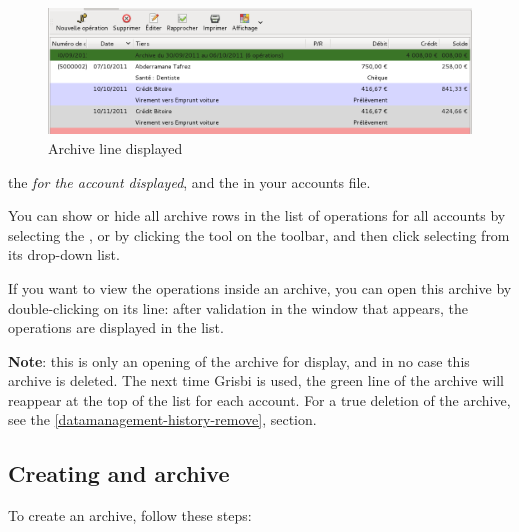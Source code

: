 \begin{figure}[htbp]
\begin{center}
\includegraphics[scale=0.5]{image/screenshot/datamanagement_history_line}
\end{center}
\caption{Archive line displayed}
\label{datamanagement-history-line-img}
\end{figure}
\else the  \emph{for the account displayed}, and the  in your accounts file.
\fi


You can show or hide all archive rows in the list of operations for all accounts by selecting the , or by clicking the  tool on the toolbar, and then click selecting  from its drop-down list.

If you want to view the operations inside an archive, you can open this archive by double-clicking on its line: after validation in the window that appears, the operations are displayed in the list.

\textbf{Note}: this is only an opening of the archive for display, and in no case this archive is deleted. The next time Grisbi is used, the green line of the archive will reappear at the top of the list for each account. For a true deletion of the archive, see the \vref{datamanagement-history-remove},  section.



\subsection{Creating and archive\label{datamanagement-history-new}}

To create an archive, follow these steps:

